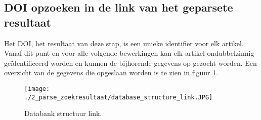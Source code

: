 \subsection{DOI opzoeken in de link van het geparsete resultaat}
Het DOI, het resultaat van deze stap, is een unieke identifier voor elk artikel. Vanaf dit punt en voor alle volgende bewerkingen kan elk artikel ondubbelzinnig geïdentificeerd worden en kunnen de bijhorende gegevens op gezocht worden. Een overzicht van de gegevens die opgeslaan worden is te zien in figuur \ref{fig:databank_structuur_link}.
\begin{figure}[h!]
    \centering
    \texttt{[image: ./2\_parse\_zoekresultaat/database\_structure\_link.JPG]}
    \caption[Databank structuur link.]{\label{fig:databank_structuur_link}Databank structuur link.}
\end{figure}
